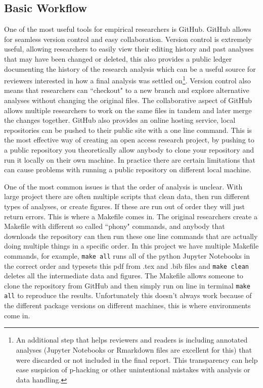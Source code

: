 \documentclass[12pt]{article}
\newcommand{\inlinecode}{\texttt}
\begin{document}
\subsection{Basic Workflow}
One of the most useful tools for empirical researchers is GitHub. GitHub allows for seamless version control and easy collaboration. Version control is extremely useful, allowing researchers to easily view their editing history and past analyses that may have been changed or deleted, this also provides a public ledger documenting the history of the research analysis which can be a useful source for reviewers interested in how a final analysis was settled on\footnote{An additional step that helps reviewers and readers is including annotated analyses (Jupyter Notebooks or Rmarkdown files are excellent for this) that were discarded or not included in the final report. This transparency can help ease suspicion of p-hacking or other unintentional mistakes with analysis or data handling.}. Version control also means that researchers can ``checkout" to a new branch and explore alternative analyses without changing the original files. The collaborative aspect of GitHub allows multiple researchers to work on the same files in tandem and later merge the changes together. GitHub also provides an online hosting service, local repositories can be pushed to their public site with a one line command. This is the most effective way of creating an open access research project, by pushing to a public repository you theoretically allow anybody to clone your repository and run it locally on their own machine. In practice there are certain limitations that can cause problems with running a public repository on different local machine.

One of the most common issues is that the order of analysis is unclear. With large project there are often multiple scripts that clean data, then run different types of analyses, or create figures. If these are run out of order they will just return errors. This is where a Makefile comes in. The original researchers create a Makefile with different so called ``phony" commands, and anybody that downloads the repository can then run these one line commands that are actually doing multiple things in a specific order. In this project we have multiple Makefile commands, for example, \inlinecode{make all} runs all of the python Jupyter Notebooks in the correct order and typesets this pdf from .tex and .bib files and \inlinecode{make clean} deletes all the intermediate data and figures. The Makefile allows someone to clone the repository from GitHub and then simply run on line in terminal \inlinecode{make all} to reproduce the results. Unfortunately this doesn't always work because of the different package versions on different machines, this is where environments come in.
\end{document}
